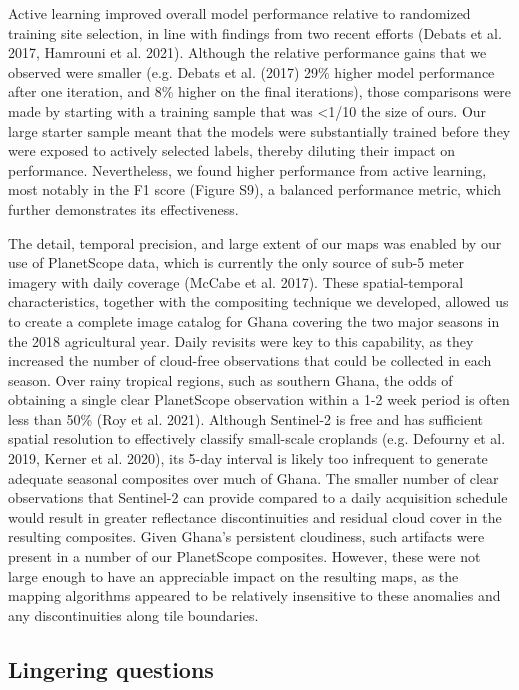 \documentclass[11pt,a4paper]{article}
\begin{document}
Active learning improved overall model performance relative to
randomized training site selection, in line with findings from two
recent efforts (Debats et al. 2017, Hamrouni et al. 2021). Although the
relative performance gains that we observed were smaller (e.g. Debats et
al. (2017) 29\% higher model performance after one iteration, and 8\%
higher on the final iterations), those comparisons were made by starting
with a training sample that was \textless1/10 the size of ours. Our
large starter sample meant that the models were substantially trained
before they were exposed to actively selected labels, thereby diluting
their impact on performance. Nevertheless, we found higher performance
from active learning, most notably in the F1 score (Figure S9), a
balanced performance metric, which further demonstrates its
effectiveness.

The detail, temporal precision, and large extent of our maps was enabled
by our use of PlanetScope data, which is currently the only source of
sub-5 meter imagery with daily coverage (McCabe et al. 2017). These
spatial-temporal characteristics, together with the compositing
technique we developed, allowed us to create a complete image catalog
for Ghana covering the two major seasons in the 2018 agricultural year.
Daily revisits were key to this capability, as they increased the number
of cloud-free observations that could be collected in each season. Over
rainy tropical regions, such as southern Ghana, the odds of obtaining a
single clear PlanetScope observation within a 1-2 week period is often
less than 50\% (Roy et al. 2021). Although Sentinel-2 is free and has
sufficient spatial resolution to effectively classify small-scale
croplands (e.g. Defourny et al. 2019, Kerner et al. 2020), its 5-day
interval is likely too infrequent to generate adequate seasonal
composites over much of Ghana. The smaller number of clear observations
that Sentinel-2 can provide compared to a daily acquisition schedule
would result in greater reflectance discontinuities and residual cloud
cover in the resulting composites. Given Ghana's persistent cloudiness,
such artifacts were present in a number of our PlanetScope composites.
However, these were not large enough to have an appreciable impact on
the resulting maps, as the mapping algorithms appeared to be relatively
insensitive to these anomalies and any discontinuities along tile
boundaries.

\hypertarget{lingering-questions}{%
\subsection{Lingering questions}\label{lingering-questions}}
\end{document}
